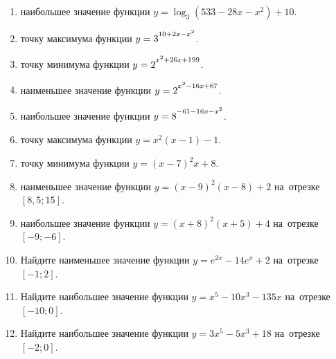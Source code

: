 \documentclass[a4paper,10pt]{article}
\begin{document}
\begin{enumerate}
\item {} наибольшее значение функции $y=\log_3\left(533-28x-x^2\right)+10$.

\item {} точку максимума функции $y=3\strut^{10+2x-x^2}$.

\item {} точку минимума функции $y=2\strut^{x^2+26x+199}$.

\item {} наименьшее значение функции $y=2\strut^{x^2-16x+67}$.

\item {} наибольшее значение функции $y=8\strut^{-61-16x-x^2}$.

\item {} точку максимума функции $y=x^2\left(x-1\right)-1$.

\item {} точку минимума функции $y=\left(x-7\right)^2x+8$.

\item {} наименьшее значение функции $y=\left(x-9\right)^2\left(x-8\right)+2$ на~отрезке~$\left[8{,}5;15\right]$.

\item {} наибольшее значение функции $y=\left(x+8\right)^2\left(x+5\right)+4$ на~отрезке~$\left[-9;-6\right]$.

\item Найдите наименьшее значение функции $y=e^{2x}-14e^x+2$ на~отрезке~$\left[-1;2\right]$.

\item Найдите наибольшее значение функции $y=x^5-10x^3-135x$ на~отрезке~$\left[-10;0\right]$.

\item Найдите наибольшее значение функции $y=3x^5-5x^3+18$ на~отрезке~$\left[-2;0\right]$.

\end{enumerate}
\end{document}
